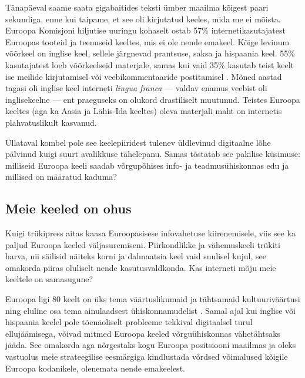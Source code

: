 \begin{multicols}{2}
Tänapäeval saame saata gigabaitides teks\-ti ümber maailma kõigest paari sekundiga, enne kui taipame, et see oli kirjutatud keeles, mida me ei mõista. 
Euroopa Komisjoni hiljutise uuringu kohaselt ostab 57\% internetikasutajatest Euroopas tooteid ja teenuseid keeltes, mis ei ole nende emakeel. 
Kõige levinum võõrkeel on inglise keel, sellele järgnevad prantsuse, saksa ja hispaania keel. 
55\% kasuta\-ja\-test loeb võõrkeelseid materjale, samas kui vaid 35\% kasutab teist keelt ise meilide kirjutamisel või veebikommentaaride postitamisel \cite{EC1}. 
Mõned aastad tagasi oli ing\-lise keel interneti \textit{lingua franca} --- valdav enamus veebist oli inglisekeelne --- ent praeguseks on olukord drastiliselt muutunud. 
Teistes Euroopa keeltes (aga ka Aasia ja Lähis-Ida keeltes) oleva materjali maht on internetis plahvatuslikult kasvanud. 

Üllataval kombel pole see keelepiiridest tulenev üldlevinud digitaalne lõhe pälvinud kuigi suurt avalikkuse tähelepanu. 
Samas tõstatab see pakilise küsimuse: milliseid Euroopa keeli saadab võrgupõhises info- ja teadmusühiskonnas edu ja millised on määratud kaduma?

\subsection{Meie keeled on ohus}

Kuigi trükipress aitas kaasa Euroopa\-sisese infovahetuse kiirenemisele, viis see ka paljud Euroopa keeled väljasuremiseni. 
Piirkondlikke ja vähemuskeeli trükiti harva, nii säilisid näiteks korni ja dalmaatsia keel vaid suulisel kujul, see omakorda piiras oluliselt nende kasutusvaldkonda. 
Kas interneti mõju meie keeltele on samasugune?

Euroopa ligi 80 keelt on üks tema väärtuslikumaid ja tähtsamaid kultuuriväärtusi ning eluline osa tema ainulaadsest ühiskonna\-mudelist \cite{EC2}. 
Samal ajal kui ing\-lise või hispaania keelel pole tõenäoliselt probleeme tekkival digitaalsel turul ellujäämisega, võivad mitmed Euroopa keeled võrguühiskonnas vähetähtsaks jääda. 
See omakorda aga nõrgestaks kogu Euroopa positsiooni maailmas ja oleks vastuolus meie strateegilise eesmärgiga kindlustada võrdsed võimalused kõigile Euroopa kodanikele, olenemata nende emakeelest. 





\end{multicols}
